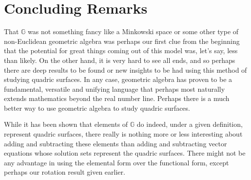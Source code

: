 \documentclass[12pt]{article}
\newcommand{\G}{\mathbb{G}}
\numberwithin{equation}{section}
\begin{document}
\section{Concluding Remarks}

That $\G$ was not something fancy like a Minkowski space or some other
type of non-Euclidean geometric algebra was perhaps our first clue from
the beginning that the potential for great things coming out of this model
was, let's say, less than likely.  On the other hand, it is very hard to see
all ends, and so perhaps there are deep results to be found or new insights
to be had using this method of studying quadric surfaces.  In any case,
geometric algebra has proven to be a fundamental, versatile and unifying
language that perhaps most naturally extends mathematics beyond the real number line.  Perhaps
there is a much better way to use geometric algebra to study quadric surfaces.

While it has been shown that elements of $\G$ do indeed, under a given
definition, represent quadric surfaces, there really is nothing more or less
interesting about adding and subtracting these elements than adding and
subtracting vector equations whose solution sets represent the quadric surfaces.
There might not be any advantage in using the elemental form over the
functional form, except perhaps our rotation result given earlier.



\end{document}
